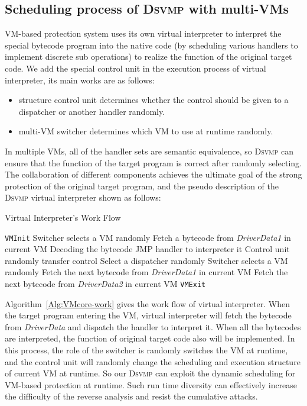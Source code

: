\documentclass[times]{secauth}
\newcommand{\DSVMP}{\textsc{Dsvmp }}
\begin{document}
\subsection{Scheduling process of \DSVMP with multi-VMs}
VM-based protection system uses its own virtual interpreter to interpret the special bytecode program into the native code
(by scheduling various handlers to implement discrete sub operations) to realize the function of the original target code.
We add the special control unit in the execution process of virtual interpreter, its main works are as follows:
\begin{itemize}
  \item structure control unit determines whether the control should be given to a dispatcher or another handler randomly.
  \item multi-VM switcher determines which VM to use at runtime randomly.
\end{itemize}

In multiple VMs, all of the handler sets are semantic equivalence,
so \DSVMP can ensure that the function of the target program is correct after randomly selecting.
The collaboration of different components achieves the ultimate goal of the strong protection of the original target program,
and the pseudo description of the \DSVMP virtual interpreter shown as follows:

\begin{algorithm}
\caption{Virtual Interpreter's Work Flow\label{Alg:VMcore-work}}
\begin{algorithmic}[1]
\STATE \texttt{VMInit}
\STATE Switcher selects a VM randomly
\STATE Fetch a bytecode from \emph{DriverData1} in current VM
\STATE Decoding the bytecode
\STATE JMP handler to interpreter it
\STATE Control unit randomly transfer control
\STATE Select a dispatcher randomly
\STATE Switcher selects a VM randomly
\STATE Fetch the next bytecode from \emph{DriverData1} in current VM
\STATE Fetch the next bytecode from \emph{DriverData2} in current VM
\ENDIF
\ENDWHILE
\STATE \texttt{VMExit}
\end{algorithmic}
\end{algorithm}

Algorithm~\ref{Alg:VMcore-work} gives the work flow of virtual interpreter.
When the target program entering the VM, virtual interpreter will fetch the bytecode from \emph{DriverData}
and dispatch the handler to interpret it.
When all the bytecodes are interpreted, the function of original target code also will be implemented.
In this process, the role of the switcher is randomly switches the VM at runtime,
and the control unit will randomly change the scheduling and execution structure of current VM at runtime.
So our \DSVMP can exploit the dynamic scheduling for VM-based protection at runtime.
Such run time diversity can effectively increase the difficulty of the reverse analysis and resist the cumulative attacks.
\end{document}
